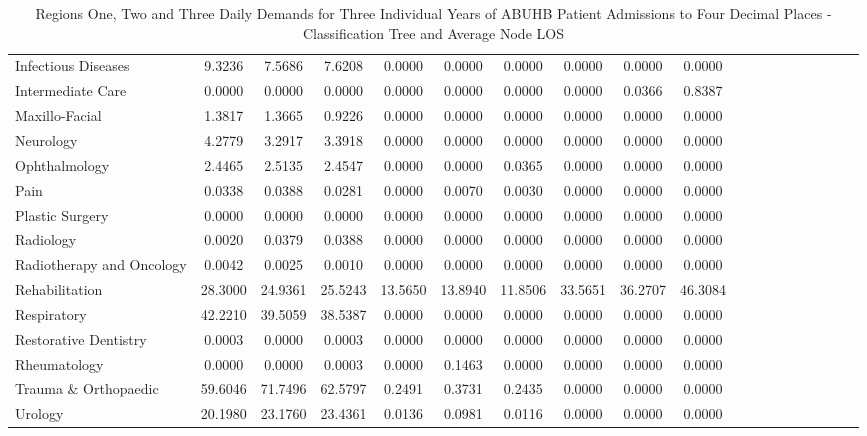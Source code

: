 \documentclass[thesis.tex]{subfiles}
\begin{document}
\begin{landscape}
\begin{table}[h!]
{\begin{tabular}{lcccccccccccccccccc}
Infectious Diseases&	9.3236&	7.5686&	7.6208&	0.0000&	0.0000&	0.0000&	0.0000&	0.0000&	0.0000\\
Intermediate Care&	0.0000&	0.0000&	0.0000&	0.0000&	0.0000&	0.0000&	0.0000&	0.0366&	0.8387\\
Maxillo-Facial&	1.3817&	1.3665&	0.9226&	0.0000&	0.0000&	0.0000&	0.0000&	0.0000&	0.0000\\
Neurology&	4.2779&	3.2917&	3.3918&	0.0000&	0.0000&	0.0000&	0.0000&	0.0000&	0.0000\\
Ophthalmology&	2.4465&	2.5135&	2.4547&	0.0000&	0.0000&	0.0365&	0.0000&	0.0000&	0.0000\\
Pain&	0.0338&	0.0388&	0.0281&	0.0000&	0.0070&	0.0030&	0.0000&	0.0000&	0.0000\\
Plastic Surgery&	0.0000&	0.0000&	0.0000&	0.0000&	0.0000&	0.0000&	0.0000&	0.0000&	0.0000\\
Radiology&	0.0020&	0.0379&	0.0388&	0.0000&	0.0000&	0.0000&	0.0000&	0.0000&	0.0000\\
Radiotherapy and Oncology&	0.0042&	0.0025&	0.0010&	0.0000&	0.0000&	0.0000&	0.0000&	0.0000&	0.0000\\
Rehabilitation&	28.3000&	24.9361&	25.5243&	13.5650&	13.8940&	11.8506&	33.5651&	36.2707&	46.3084\\
Respiratory&	42.2210&	39.5059&	38.5387&	0.0000&	0.0000&	0.0000&	0.0000&	0.0000&	0.0000\\
Restorative Dentistry&	0.0003&	0.0000&	0.0003&	0.0000&	0.0000&	0.0000&	0.0000&	0.0000&	0.0000\\
Rheumatology&	0.0000&	0.0000&	0.0003&	0.0000&	0.1463&	0.0000&	0.0000&	0.0000&	0.0000\\
Trauma \& Orthopaedic&	59.6046&	71.7496&	62.5797&	0.2491&	0.3731&	0.2435&	0.0000&	0.0000&	0.0000\\
Urology&	20.1980&	23.1760&	23.4361&	0.0136&	0.0981&	0.0116&	0.0000&	0.0000&	0.0000\\\bottomrule

    \end{tabular}  } 
\caption{Regions One, Two and Three Daily Demands for Three Individual Years of ABUHB Patient Admissions to Four Decimal Places - Classification Tree and Average Node LOS}
    \label{apptab:LinkedDemands7a}
\end{table}



\end{landscape}
\end{document}
